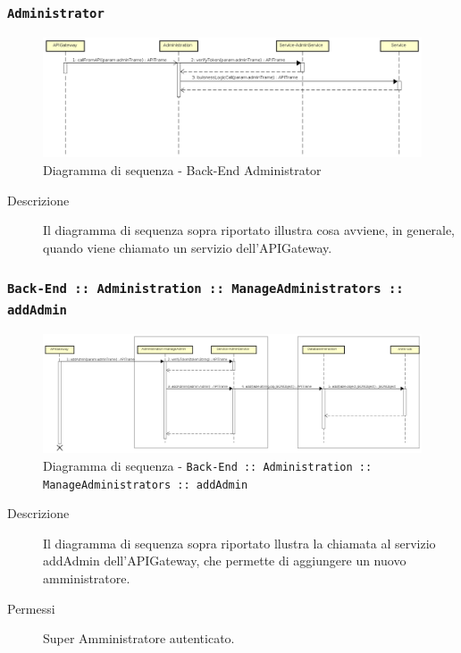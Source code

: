 \documentclass[../DefinizioneDiProdotto.tex]{subfiles}
\begin{document}
		\newpage
		\subsubsection{\texttt{Administrator}}
		\begin{figure}[!h]
			\centering
			\includegraphics[width=\textwidth]{DiagrammiSequenza/Back-End/DiagrammaSequenzaBackendAdmin.png}
			\caption{Diagramma di sequenza - Back-End Administrator }
		\end{figure}
		\begin{description}
			\item [Descrizione] Il diagramma di sequenza sopra riportato illustra cosa avviene, in generale, quando viene chiamato un servizio dell'APIGateway.
		\end{description}

		\subsubsection{\texttt{Back-End :: Administration :: ManageAdministrators :: addAdmin}}
		\begin{figure}[!h]
			\centering
			\includegraphics[width=\textwidth]{DiagrammiSequenza/Back-End/manageAdministrators/addAdmin.png}
			\caption{Diagramma di sequenza - \texttt{Back-End :: Administration :: ManageAdministrators :: addAdmin} }
		\end{figure}
		\begin{description}
			\item [Descrizione] Il diagramma di sequenza sopra riportato  llustra la chiamata al servizio addAdmin dell'APIGateway, che permette di aggiungere un nuovo amministratore.
			\item [Permessi] Super Amministratore autenticato.
		\end{description}
\end{document}
